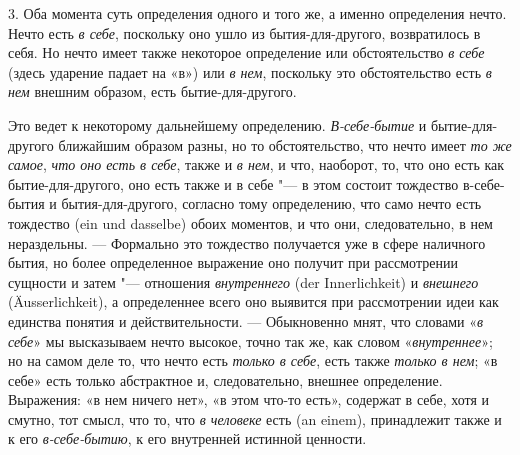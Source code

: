 3. Оба момента суть определения одного и того же, а именно определения
нечто. Нечто есть {\em в себе}, поскольку оно ушло из
бытия-для-другого, возвратилось в себя. Но нечто имеет также некоторое
определение или обстоятельство {\em в себе} (здесь
ударение падает на «в») или {\em в нем}, поскольку это
обстоятельство есть {\em в нем} внешним образом, есть
бытие-для-другого.

Это ведет к некоторому дальнейшему определению.
{\em В-себе-бытие} и бытие-для-другого ближайшим
образом разны, но то обстоятельство, что нечто имеет
{\em то же самое}, {\em что оно
есть в себе}, также и {\em в нем}, и что, наоборот, то,
что оно есть как бытие-для-другого, оно есть также и в себе "--- в этом
состоит тождество в-себе-бытия и бытия-для-другого, согласно тому
определению, что само нечто есть тождество (ein und dasselbe) обоих
моментов, и что они, следовательно, в нем нераздельны. — Формально это
тождество получается уже в сфере наличного бытия, но более определенное
выражение оно получит при рассмотрении сущности и затем "--- отношения
{\em внутреннего} (der Innerlichkeit) и
{\em внешнего} (Äusserlichkeit), а определеннее всего
оно выявится при рассмотрении идеи как единства понятия и действительности.
— Обыкновенно мнят, что словами «{\em в себе}» мы
высказываем нечто высокое, точно так же, как словом
«{\em внутреннее}»; но на самом деле то, что нечто есть
{\em только в себе}, есть также
{\em только в нем}; «в себе» есть только абстрактное и,
следовательно, внешнее определение. Выражения: «в нем ничего нет», «в этом
что-то есть», содержат в себе, хотя и смутно, тот смысл, что то, что
{\em в человеке} есть (an einem), принадлежит также и к
его {\em в-себе-бытию}, к его внутренней истинной
ценности.

